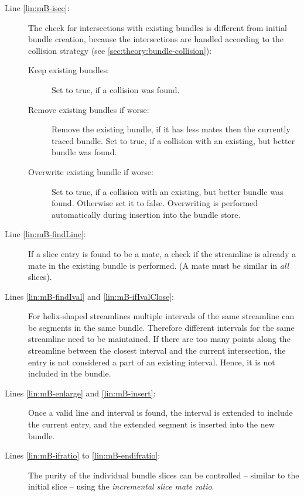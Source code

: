 \begin{description}
%
	\item[Line \ref{lin:mB-isec}:] The check for intersections with existing bundles is different from initial bundle creation, because the intersections are handled according to the collision strategy (see \autoref{sec:theory:bundle-collision}):
	\begin{description}
		\item[Keep existing bundles:] Set  to true, if a collision was found.
		\item[Remove existing bundles if worse:] Remove the existing bundle, if it has less mates then the currently traced bundle. Set  to true, if a collision with an existing, but better bundle was found.
		\item[Overwrite existing bundle if worse:] Set  to true, if a collision with an existing, but better bundle was found. Otherwise set it to false. Overwriting is performed automatically during insertion into the bundle store.
	\end{description}
%
	\item[Line \ref{lin:mB-findLine}:] If a slice entry is found to be a mate, a check if the streamline is already a mate in the existing bundle is performed. (A mate must be similar in \emph{all} slices).
%
	\item[Lines \ref{lin:mB-findIval} and \ref{lin:mB-ifIvalClose}:] For helix-shaped streamlines multiple intervals of the same streamline can be segments in the same bundle. Therefore different intervals for the same streamline need to be maintained. If there are too many points along the streamline between the closest interval and the current intersection, the entry is not considered a part of an existing interval. Hence, it is not included in the bundle.
%
	\item[Lines \ref{lin:mB-enlarge} and \ref{lin:mB-insert}:] Once a valid line and interval is found, the interval is extended to include the current entry, and the extended segment is inserted into the new bundle.
%
	\item[Lines \ref{lin:mB-ifratio} to \ref{lin:mB-endifratio}:] The purity of the individual bundle slices can be controlled -- similar to the initial slice -- using the \emph{incremental slice mate ratio}.
%
\end{description}

